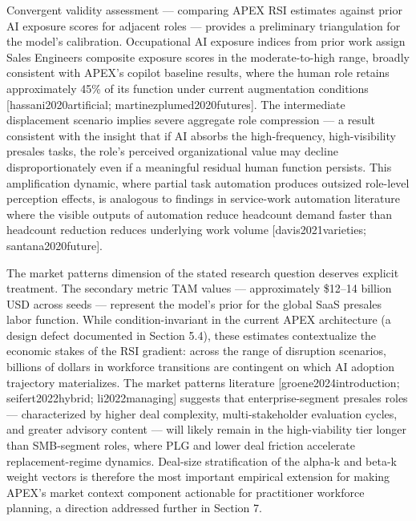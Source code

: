 \documentclass[10pt, conference]{IEEEtran}
\begin{document}
{Convergent validity assessment --- comparing APEX RSI estimates against prior AI exposure scores for adjacent roles --- provides a preliminary triangulation for the model's calibration. Occupational AI exposure indices from prior work assign Sales Engineers composite exposure scores in the moderate-to-high range, broadly consistent with APEX's copilot baseline results, where the human role retains approximately 45\% of its function under current augmentation conditions [hassani2020artificial; martinezplumed2020futures]. The intermediate displacement scenario implies severe aggregate role compression --- a result consistent with the insight that if AI absorbs the high-frequency, high-visibility presales tasks, the role's perceived organizational value may decline disproportionately even if a meaningful residual human function persists. This amplification dynamic, where partial task automation produces outsized role-level perception effects, is analogous to findings in service-work automation literature where the visible outputs of automation reduce headcount demand faster than headcount reduction reduces underlying work volume [davis2021varieties; santana2020future].

The market patterns dimension of the stated research question deserves explicit treatment. The secondary metric TAM values --- approximately \$12--14 billion USD across seeds --- represent the model's prior for the global SaaS presales labor function. While condition-invariant in the current APEX architecture (a design defect documented in Section 5.4), these estimates contextualize the economic stakes of the RSI gradient: across the range of disruption scenarios, billions of dollars in workforce transitions are contingent on which AI adoption trajectory materializes. The market patterns literature [groene2024introduction; seifert2022hybrid; li2022managing] suggests that enterprise-segment presales roles --- characterized by higher deal complexity, multi-stakeholder evaluation cycles, and greater advisory content --- will likely remain in the high-viability tier longer than SMB-segment roles, where PLG and lower deal friction accelerate replacement-regime dynamics. Deal-size stratification of the alpha-k and beta-k weight vectors is therefore the most important empirical extension for making APEX's market context component actionable for practitioner workforce planning, a direction addressed further in Section 7.

}
\end{document}
